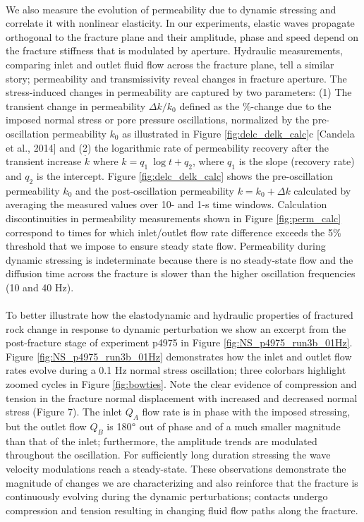 \documentclass[letterpaper,10pt]{article}
\begin{document}
\paragraph{}
We also measure the evolution of permeability due to dynamic stressing and correlate it with nonlinear elasticity. In our experiments, elastic waves propagate orthogonal to the fracture plane and their amplitude, phase and speed depend on the fracture stiffness that is modulated by aperture. Hydraulic measurements, comparing inlet and outlet fluid flow across the fracture plane, tell a similar story; permeability and transmissivity reveal changes in fracture aperture.
The stress-induced changes in permeability are captured by two parameters: (1) The transient change in permeability $ \Delta k/k_0 $ defined as the \%-change due to the imposed normal stress or pore pressure oscillations, normalized by the pre-oscillation permeability $ k_0 $ as illustrated in Figure \ref{fig:delc_delk_calc}c [Candela et al., 2014] and (2) the logarithmic rate of permeability recovery after the transient increase $ \dot k $ where $ k = q_1\ \log{t} + q_2 $, where $q_1$ is the slope (recovery rate) and $q_2$ is the intercept.
Figure \ref{fig:delc_delk_calc} shows the pre-oscillation permeability $ k_0 $ and the post-oscillation permeability $ k = k_0 + \Delta k $ calculated by averaging the measured values over 10- and 1-s time windows. Calculation discontinuities in permeability measurements shown in Figure \ref{fig:perm_calc} correspond to times for which inlet/outlet flow rate difference exceeds the 5\% threshold that we impose to ensure steady state flow. Permeability during dynamic stressing is indeterminate because there is no steady-state flow and the diffusion time across the fracture is slower than the higher oscillation frequencies (10 and  40 Hz). 

\paragraph{}
To better illustrate how the elastodynamic and hydraulic properties of fractured rock change in response to dynamic perturbation we show an excerpt from the post-fracture stage of experiment p4975 in Figure \ref{fig:NS_p4975_run3b_01Hz}.
Figure  \ref{fig:NS_p4975_run3b_01Hz} demonstrates how the inlet and outlet flow rates evolve during a 0.1 Hz normal stress oscillation; three colorbars highlight zoomed cycles in Figure \ref{fig:bowties}. Note the clear evidence of compression and tension in the fracture normal displacement with increased and decreased normal stress (Figure 7). The inlet $ Q_A $ flow rate is in phase with the imposed stressing, but the outlet flow $ Q_B $ is 180$\degree$ out of phase and of a much smaller magnitude than that of the inlet;  furthermore, the amplitude trends are modulated throughout the oscillation. For sufficiently long duration stressing the wave velocity modulations reach a steady-state. These observations demonstrate the magnitude of changes we are characterizing and also reinforce that the fracture is continuously evolving during the dynamic perturbations; contacts undergo compression and tension resulting in changing fluid flow paths along the fracture.
\end{document}
